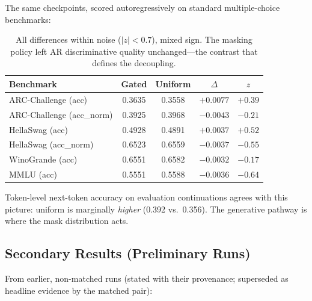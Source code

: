 \documentclass{article}
\begin{document}
The same checkpoints, scored autoregressively on standard multiple-choice benchmarks:

\begin{table}[h]
\centering
\begin{tabular}{lcccc}
\toprule
Benchmark & Gated & Uniform & $\Delta$ & $z$ \\
\midrule
ARC-Challenge (acc) & 0.3635 & 0.3558 & $+0.0077$ & $+0.39$ \\
ARC-Challenge (acc\_norm) & 0.3925 & 0.3968 & $-0.0043$ & $-0.21$ \\
HellaSwag (acc) & 0.4928 & 0.4891 & $+0.0037$ & $+0.52$ \\
HellaSwag (acc\_norm) & 0.6523 & 0.6559 & $-0.0037$ & $-0.55$ \\
WinoGrande (acc) & 0.6551 & 0.6582 & $-0.0032$ & $-0.17$ \\
MMLU (acc) & 0.5551 & 0.5588 & $-0.0036$ & $-0.64$ \\
\bottomrule
\end{tabular}
\caption{All differences within noise ($|z| < 0.7$), mixed sign. The masking policy
left AR discriminative quality unchanged---the contrast that defines the decoupling.}
\label{tab:decoupling}
\end{table}

Token-level next-token accuracy on evaluation continuations agrees with this picture:
uniform is marginally \emph{higher} (0.392 vs.\ 0.356). The generative pathway is
where the mask distribution acts.

\subsection{Secondary Results (Preliminary Runs)}
\label{sec:secondary}

From earlier, non-matched runs (stated with their provenance; superseded as headline
evidence by the matched pair):
\end{document}
